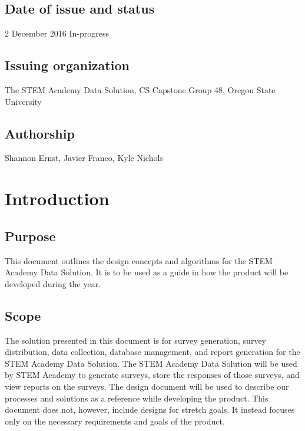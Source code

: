 \subsection{Date of issue and status}
2 December 2016 In-progress
\subsection{Issuing organization}
The STEM Academy Data Solution, CS Capstone Group 48, Oregon State University 
\subsection{Authorship}
Shannon Ernst, Javier Franco, Kyle Nichols

\section{Introduction}
\subsection{Purpose}
This document outlines the design concepts and algorithms for the STEM Academy Data Solution.
It is to be used as a guide in how the product will be developed during the year. 
\subsection{Scope}
The solution presented in this document is for survey generation, survey distribution, data collection, database management, and report generation for the STEM Academy Data Solution.
The STEM Academy Data Solution will be used by STEM Academy to generate surveys, store the responses of those surveys, and view reports on the surveys.
The design document will be used to describe our processes and solutions as a reference while developing the product.
This document does not, however, include designs for stretch goals. 
It instead focuses only on the necessary requirements and goals of the product.
